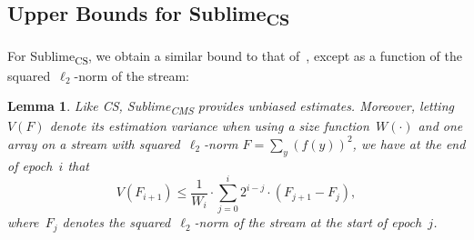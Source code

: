 \documentclass[sigconf]{acmart}
\newtheorem{lemma}[theorem]{Lemma}
\newcommand{\sketch}{Sublime}
\newcommand{\sketchcms}{\sketch\textsubscript{CMS}\xspace}
\newcommand{\sketchcs}{\sketch\textsubscript{CS}\xspace}
\begin{document}
\subsection{Upper Bounds for \sketchcs}\label{apx:upper_bounds_cs}
For \sketchcs, we obtain a similar bound to that of~, except
as a function of the squared~$\ell_2${\nobreakdash-}norm of the stream:
\begin{lemma}
    \label{lemma:cs-w} 
    Like CS, \sketchcms provides unbiased estimates. Moreover, letting~$V(F)$
    denote its estimation variance when using a size function~$W(\cdot)$ and
    one array on a stream with squared~$\ell_2${\nobreakdash-}norm $F = \sum_y
    (f(y))^2$, we have at the end of epoch~$i$ that
    $$ V(F_{i+1}) \leq \frac{1}{W_i} \cdot \sum_{j=0}^i 2^{i-j} \cdot (F_{j+1} - F_j), $$
    where~$F_j$ denotes the squared~$\ell_2${\nobreakdash-}norm of the stream
    at the start of epoch~$j$. 
\end{lemma}
\end{document}
